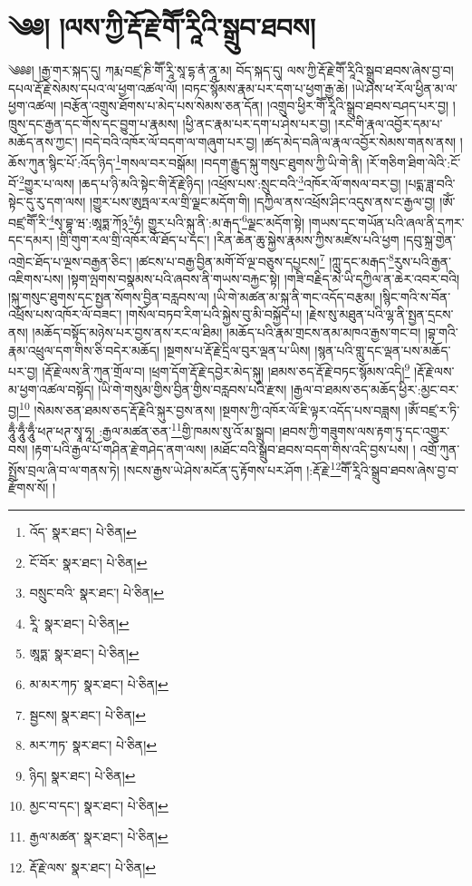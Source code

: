 \setcounter{footnote}{0} 
\chapter{༄༅། །ལས་ཀྱི་རྡོ་རྗེ་གཽ་རཱིའི་སྒྲུབ་ཐབས།}༄༅༅། །རྒྱ་གར་སྐད་དུ། ཀརྨ་བཛྲ་ཎི་གཽ་རཱི་སཱ་དྷ་ནཾ་ནཱ་མ། བོད་སྐད་དུ། ལས་ཀྱི་རྡོ་རྗེ་གཽ་རཱིའི་སྒྲུབ་ཐབས་ཞེས་བྱ་བ། དཔལ་རྡོ་རྗེ་སེམས་དཔའ་ལ་ཕྱག་འཚལ་ལོ། །བཏང་སྙོམས་རྣམ་པར་དག་པ་ཕྱག་རྒྱ་ཆེ། །ཡེ་ཤེས་ཕ་རོལ་ཕྱིན་མ་ལ་ཕྱག་འཚལ། །བརྩོན་འགྲུས་ཐོགས་པ་མེད་པས་སེམས་ཅན་དོན། །འགྲུབ་ཕྱིར་གཽ་རཱིའི་སྒྲུབ་ཐབས་བཤད་པར་བྱ། །ཁྲུས་དང་རྒྱན་དང་གོས་དང་བྱུག་པ་རྣམས། །ཕྱི་ནང་རྣམ་པར་དག་པ་ཤེས་པར་བྱ། །རང་གི་རྣལ་འབྱོར་དམ་པ་མཆོད་ནས་ཀྱང་། །བདེ་བའི་འཁོར་ལོ་བདག་ལ་གཞུག་པར་བྱ། །ཚད་མེད་བཞི་ལ་རྣལ་འབྱོར་སེམས་གནས་ནས། །ཆོས་ཀུན་སྙིང་པོ་:འོད་ཉིད་\footnote{འོད་  སྣར་ཐང་།  པེ་ཅིན། }གསལ་བར་བསྒོམ། །བདག་རྒྱུད་སྐུ་གསུང་ཐུགས་ཀྱི་ཡི་གེ་ནི། །རོ་གཅིག་ཐིག་ལེའི་:ངོ་བོ་\footnote{ངོ་བོར་  སྣར་ཐང་།  པེ་ཅིན། }གྱུར་པ་ལས། །ཆད་པ་ཉི་མའི་སྟེང་གི་རྡོ་རྗེ་ཉིད། །འཕྲོས་པས་:སྲུང་བའི་\footnote{བསྲུང་བའི་  སྣར་ཐང་།  པེ་ཅིན། }འཁོར་ལོ་གསལ་བར་བྱ། །པདྨ་ཟླ་བའི་སྟེང་དུ་རུ་དག་ལས། །གྱུར་པས་ཨུཏྤལ་རལ་གྲི་ལྗང་མདོག་གི། །དཀྱིལ་ནས་འཕྲོས་ཤིང་འདུས་ནས་ང་རྒྱལ་བྱ། །ཨོཾ་བཛྲ་གཽ་རི་\footnote{རཱི་  སྣར་ཐང་།  པེ་ཅིན། }སྭ་བྷཱ་ཝ་:ཨཱཏྨ་ཀོ྅\footnote{ཨཱཏྨ་  སྣར་ཐང་།  པེ་ཅིན། }ཧཾ། གྱུར་པའི་སྐུ་ནི་:མ་རྒད་\footnote{མ་མར་ཀཏ་  སྣར་ཐང་།  པེ་ཅིན། }ལྗང་མདོག་སྟེ། །གཡས་དང་གཡོན་པའི་ཞལ་ནི་དཀར་དང་དམར། །གྲི་གུག་རལ་གྲི་འཁོར་ལོ་ཐོད་པ་དང་། །རིན་ཆེན་ཆུ་སྐྱེས་རྣམས་ཀྱིས་མཛེས་པའི་ཕྱག །དབུ་སྐྲ་གྱེན་འགྲེང་ཐོད་པ་ལྔས་བརྒྱན་ཅིང་། །ཚངས་པ་བརྒྱ་བྱིན་མགོ་བོ་ལྔ་བཅུས་དཔྱངས།\footnote{སྦྱངས།  སྣར་ཐང་།  པེ་ཅིན། } །ཀླུ་དང་མརྒད་\footnote{མར་ཀཏ་  སྣར་ཐང་།  པེ་ཅིན། }རུས་པའི་རྒྱན་འཇིགས་པས། །སྟག་ལྤགས་བསྣམས་པའི་ཞབས་ནི་གཡས་བརྐྱང་སྟེ། །གཟི་བརྗིད་མེ་ཡི་དཀྱིལ་ན་ཆེར་འབར་བའི། །སྐུ་གསུང་ཐུགས་དང་སྤྱན་སོགས་བྱིན་བརླབས་ལ། །ཡི་གེ་མཚན་མ་སྐུ་ནི་གང་འདོད་བརྩམ། །སྙིང་གའི་ས་བོན་འཕྲོས་པས་འཁོར་ལོ་བཟང་། །གསོལ་བཏབ་རིག་པའི་སྐྱེས་བུ་མི་བསྐྱོད་པ། །རྗེས་སུ་མཐུན་པའི་ལྷ་ནི་སྤྱན་དྲངས་ནས། །མཆོད་བསྟོད་མཉེས་པར་བྱས་ནས་རང་ལ་ཐིམ། །མཆོད་པའི་རྣམ་གྲངས་ནམ་མཁའ་རྒྱས་གང་བ། །བྷ་གའི་རྣམ་འཕྲུལ་དག་གིས་ཅི་བདེར་མཆོད། །སྔགས་པ་རྡོ་རྗེ་དྲིལ་བུར་ལྡན་པ་ཡིས། །སྙན་པའི་གླུ་དང་ལྡན་པས་མཆོད་པར་བྱ། །རྡོ་རྗེ་ལས་ནི་ཀུན་གྲོལ་བ། །ཕྲག་དོག་རྡོ་རྗེ་དབྱེར་མེད་སྐུ། །ཐམས་ཅད་རྡོ་རྗེ་བཏང་སྙོམས་འདི།\footnote{ཉིད།  སྣར་ཐང་།  པེ་ཅིན། } །རྡོ་རྗེ་ལས་མ་ཕྱག་འཚལ་བསྟོད། །ཡི་གེ་གསུམ་གྱིས་བྱིན་གྱིས་བརླབས་པའི་རྫས། །རྒྱལ་བ་ཐམས་ཅད་མཆོད་ཕྱིར་:མྱང་བར་བྱ།\footnote{མྱང་བ་དང་།  སྣར་ཐང་།  པེ་ཅིན། } །སེམས་ཅན་ཐམས་ཅད་རྡོ་རྗེའི་སྐུར་བྱས་ནས། །སྔགས་ཀྱི་འཁོར་ལོ་ཇི་ལྟར་འདོད་པས་བཟླས། །ཨོཾ་བཛྲ་ར་ཏི་ཧཱུྃ་ཧཱུྃ་ཧཱུྃ་ཕཊ་ཕཊ་སྭཱ་ཧཱ། :རྒྱལ་མཚན་ཅན་\footnote{རྒྱལ་མཚན་  སྣར་ཐང་།  པེ་ཅིན། }གྱི་ཁམས་སུ་འོ་མ་སྒྲུབ། །ཐབས་ཀྱི་གཟུགས་ལས་རྟག་ཏུ་དང་འགྱུར་བས། །རྟག་པའི་རྒྱལ་པོ་གཤིན་རྗེ་གཤེད་ནག་ལས། །མཐོང་བའི་སྒྲུབ་ཐབས་བདག་གིས་འདི་བྱས་པས། །
འགྲོ་ཀུན་སྤྲོས་བྲལ་ཞི་བ་ལ་གནས་ཏེ། །སངས་རྒྱས་ཡེ་ཤེས་མངོན་དུ་རྟོགས་པར་ཤོག །:རྡོ་རྗེ་\footnote{རྡོ་རྗེ་ལས་  སྣར་ཐང་།  པེ་ཅིན། }གཽ་རཱིའི་སྒྲུབ་ཐབས་ཞེས་བྱ་བ་རྫོགས་སོ། ། 
